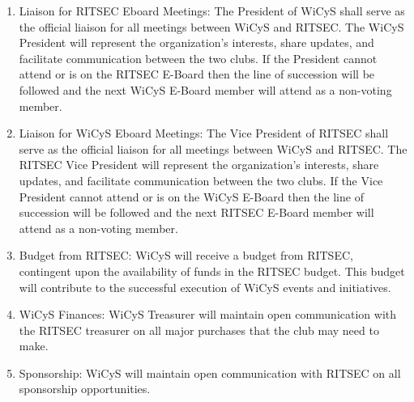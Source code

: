 
\begin{enumerate}
      \item Liaison for RITSEC Eboard Meetings: The President of WiCyS shall serve as the official liaison for all meetings between WiCyS and RITSEC. The WiCyS President will represent the organization's interests, share updates, and facilitate communication between the two clubs. If the President cannot attend or is on the RITSEC E-Board then the line of succession will be followed and the next WiCyS E-Board member will attend as a non-voting member.
      \item Liaison for WiCyS Eboard Meetings: The Vice President of RITSEC shall serve as the official liaison for all meetings between WiCyS and RITSEC. The RITSEC Vice President will represent the organization's interests, share updates, and facilitate communication between the two clubs. If the Vice President cannot attend or is on the WiCyS E-Board then the line of succession will be followed and the next RITSEC E-Board member will attend as a non-voting member.
      \item Budget from RITSEC: WiCyS will receive a budget from RITSEC, contingent upon the availability of funds in the RITSEC budget. This budget will contribute to the successful execution of WiCyS events and initiatives.
      \item WiCyS Finances: WiCyS Treasurer will maintain open communication with the RITSEC treasurer on all major purchases that the club may need to make.
      \item Sponsorship: WiCyS will maintain open communication with RITSEC on all sponsorship opportunities.
\end{enumerate}